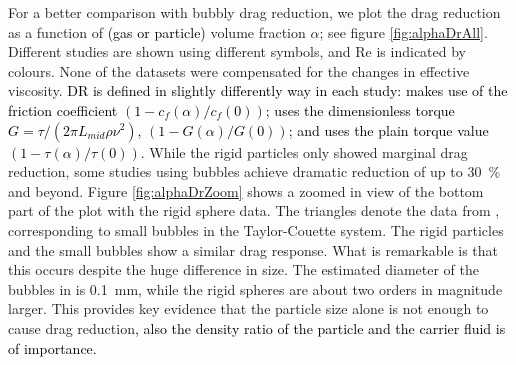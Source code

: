 \documentclass{jfm}
\newcommand\rey{\text{Re}}
\newcommand{\red}[1]{\textcolor{black}{#1}}
\begin{document}
For a better comparison with bubbly drag reduction, we plot the drag reduction
as a function of \red{(gas or particle)} volume fraction $\alpha$; see figure
\ref{fig:alphaDrAll}. Different studies are shown using different symbols, and
$\rey$ is indicated by colours. None of the datasets were compensated for the
changes in effective viscosity.  \red{ DR is defined in slightly differently
way in each study: \cite{vandenBerg2005} makes use of the friction coefficient
$\left(1 - c_f(\alpha) /c_f(0) \right)$; \cite{vanGils2013} uses the
dimensionless torque $G=\tau / (2 \pi L_{mid} \rho \nu^2)$, $\left(1 -
G(\alpha) / G(0) \right)$; and \cite{Verschoof2016} uses the plain torque
value $\left(1 - \tau(\alpha) /\tau(0) \right)$.} While the rigid particles
only showed marginal drag reduction, some studies using bubbles achieve
dramatic reduction of up to \SI{30}{\percent} and beyond.  Figure
\ref{fig:alphaDrZoom} shows a zoomed in view of the bottom part of the plot
with the rigid sphere data. The triangles denote the data from
\cite{Verschoof2016}, corresponding to small bubbles in the Taylor-Couette
system. The rigid particles and the small bubbles show a similar drag
response. What is remarkable is that this occurs despite the huge difference
in size. The estimated diameter of the bubbles in \cite{Verschoof2016} is
\SI{0.1}{\milli \metre}, while the rigid spheres are about two orders in
magnitude larger. This provides key evidence that the particle size alone is
not enough to cause drag reduction\red{, also the density ratio of the
particle and the carrier fluid is of importance.
}
\end{document}

